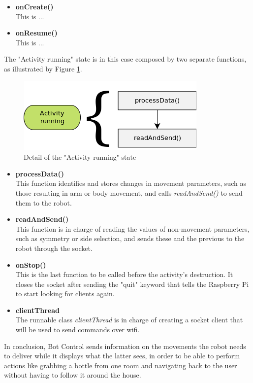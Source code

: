 	\begin{itemize}

	\item \textbf{onCreate()} \hfill \\
	This is ...\\

	\item \textbf{onResume()} \hfill \\
	This is ...


	\end{itemize}

\bigskip

The "Activity running" state is in this case composed by two separate functions, as illustrated by Figure \ref{activityDetail}.

	\begin{figure}[H]
      \centering
      \includegraphics[scale=.8]{images/Diagrams/androidActivity.png}
      \caption{Detail of the "Activity running" state}
      \label{activityDetail}
	\end{figure}

\bigskip

	\begin{itemize}

	\item \textbf{processData()} \hfill \\
	This function identifies and stores changes in movement parameters, such as those resulting in arm or body movement, and calls \textit{readAndSend()} to send them to the robot.\\

	\item \textbf{readAndSend()} \hfill \\
	This function is in charge of reading the values of non-movement parameters, such as symmetry or side selection, and sends these and the previous to the robot through the socket.\\

	\item \textbf{onStop()} \hfill \\
	This is the last function to be called before the activity's destruction. It closes the socket after sending the "quit" keyword that tells the Raspberry Pi to start looking for clients again. \\

	\item \textbf{clientThread} \hfill \\
	The runnable class \textit{clientThread} is in charge of creating a socket client that will be used to send commands over wifi.\\

	\end{itemize}

\bigskip

In conclusion, Bot Control sends information on the movements the robot needs to deliver while it displays what the latter sees, in order to be able to perform actions like grabbing a bottle from one room and navigating back to the user without having to follow it around the house.
